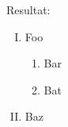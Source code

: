 \noindent Resultat:
\begin{enumerate}[I.]
    \item Foo
    \begin{enumerate}[a =]
        \item Bar
        \item Bat
    \end{enumerate}
    \item Baz
\end{enumerate}